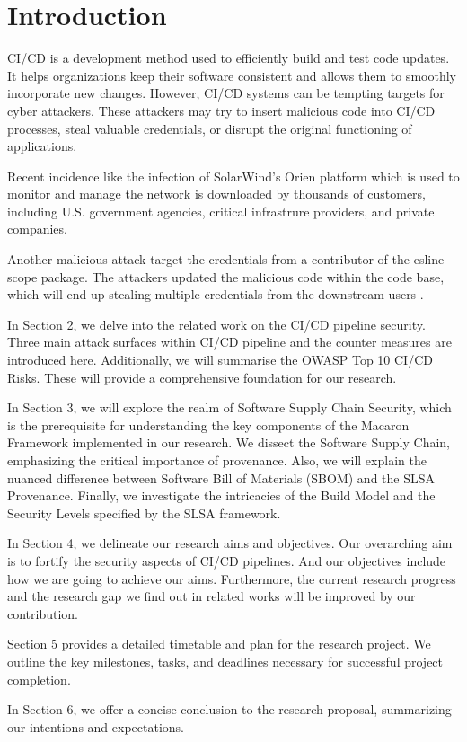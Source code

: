 \section{Introduction}
CI/CD is a development method used to efficiently build and test code updates. 
It helps organizations keep their software consistent and allows them to smoothly 
incorporate new changes. However, CI/CD systems can be tempting targets for cyber attackers. 
These attackers may try to insert malicious code into CI/CD processes, 
steal valuable credentials, or disrupt the original functioning of applications.

Recent incidence like the infection of SolarWind's Orien platform \cite{ladisa2023sok, 
peisert2021perspectives} which is used to monitor and manage the network is downloaded by 
thousands of customers, including U.S. government agencies, critical infrastrure providers, 
and private companies. 

Another malicious attack target the credentials from a contributor of the esline-scope package.
The attackers updated the malicious code within the code base, which will end up stealing
multiple credentials from the downstream users \cite{eslint2018}.

In Section 2, we delve into the related work on the CI/CD pipeline security. Three main 
attack surfaces within CI/CD pipeline and the counter measures are introduced here. 
Additionally, we will summarise the OWASP Top 10 CI/CD Risks. These will provide a comprehensive
foundation for our research. 

In Section 3, we will explore the realm of Software Supply Chain Security, which is the prerequisite
for understanding the key components of the Macaron Framework implemented in our research.
We dissect the Software Supply Chain, emphasizing the critical importance of provenance. 
Also, we will explain the nuanced difference between Software Bill of Materials (SBOM) and the SLSA Provenance.
Finally, we investigate the intricacies of the Build Model and the Security Levels specified by the SLSA framework.

In Section 4, we delineate our research aims and objectives. Our overarching aim is to fortify the security aspects of CI/CD pipelines. 
And our objectives include how we are going to achieve our aims. Furthermore, the current research 
progress and the research gap we find out in related works will be improved by our contribution.

Section 5 provides a detailed timetable and plan for the research project. 
We outline the key milestones, tasks, and deadlines necessary for successful project completion.

In Section 6, we offer a concise conclusion to the research proposal, summarizing our intentions and expectations.